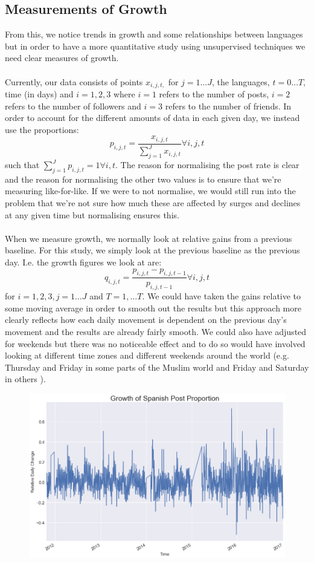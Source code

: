 \documentclass[12pt]{article}
\begin{document}
\subsection{Measurements of Growth}
From this, we notice trends in growth and some relationships between languages but in order to have a more quantitative study using unsupervised techniques we need clear measures of growth. \\\\
Currently, our data consists of points $x_{i,j,t,}$ for $j=1\ldots J$, the languages, $t=0 \ldots T$, time (in days) and $i=1,2,3$ where $i=1$ refers to the number of posts, $i=2$ refers to the number of followers and $i=3$ refers to the number of friends. In order to account for the different amounts of data in each given day, we instead use the proportions: $$p_{i,j,t} = \frac{x_{i,j,t}}{\sum_{j=1}^{J} x_{i,j,t}} \forall i,j,t$$ such that $\sum_{j=1}^{J} p_{i,j,t} = 1 \forall i,t$. The reason for normalising the post rate is clear and the reason for normalising the other two values is to ensure that we're measuring like-for-like. If we were to not normalise, we would still run into the problem that we're not sure how much these are affected by surges and declines at any given time but normalising ensures this. \\\\
When we measure growth, we normally look at relative gains from a previous baseline. For this study, we simply look at the previous baseline as the previous day. I.e. the growth figures we look at are:
$$ q_{i,j,t} = \frac{p_{i,j,t} - p_{i,j,t-1}}{p_{i,j,t-1}} \forall i,j,t$$ for $i=1,2,3, j = 1 \ldots J$ and $T=1,\ldots T$. We could have taken the gains relative to some moving average in order to smooth out the results but this approach more clearly reflects how each daily movement is dependent on the previous day's movement and the results are already fairly smooth. We could also have adjusted for weekends but there was no noticeable effect and to do so would have involved looking at different time zones and different weekends around the world (e.g. Thursday and Friday in some parts of the Muslim world and Friday and Saturday in others \cite{Weekends}).
\FloatBarrier
\begin{figure}[hbtp]\centering
\includegraphics[width=\textwidth,clip]{SpanishProportionGrowth.png}
\end{figure}
\FloatBarrier
\newpage
\end{document}
